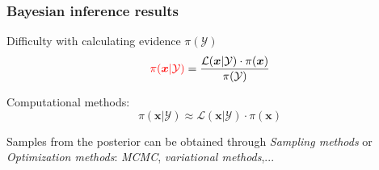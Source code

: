 \begin{frame}
\frametitle{Bayesian inference results}
\begin{block}{Difficulty with calculating evidence $\pi(\mathcal{Y})$}
\begin{equation*}               
\textcolor{red}{\pi(\boldsymbol{x}|\mathcal{Y})} = 
\frac{{\mathcal{L}(\boldsymbol{x}|\mathcal{Y})} \cdot \pi(\boldsymbol{x})}{{\pi(\mathcal{Y})}}
\end{equation*}
\end{block}


Computational methods:
 \begin{equation*}               \pi(\boldsymbol{x}|\mathcal{Y}) \approx 
{\mathcal{L}(\boldsymbol{x}|\mathcal{Y}) \cdot \pi(\boldsymbol{x})}
\end{equation*}     

Samples from the posterior can be obtained through \textit{Sampling methods} or \textit{Optimization methods}: \textit{MCMC}, \textit{variational methods},...
\end{frame}
